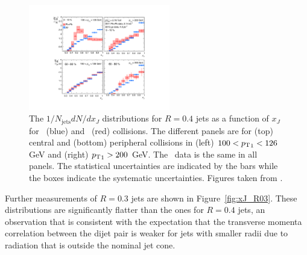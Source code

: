 \begin{figure}[htbp]
\begin{center}
\includegraphics[width=0.55\textwidth]{figures/jetMeasurements/xJ}
\caption{The $1/N_\mathrm{jets} dN/dx_J$ distributions for $R=0.4$ jets as a function of $x_J$ for \pp\ (blue) and \pbpb\ (red) collisions. The different panels are for (top) central and (bottom) peripheral collisions in (left) $100 < \mbox{$p_{\mathrm{T}}$}_1 < 126$ GeV and (right) $\mbox{$p_{\mathrm{T}}$}_1 > 200 $ GeV. The \pp\ data is the same in all panels. The statistical uncertainties are indicated by the bars while the boxes indicate the systematic uncertainties. Figures taken from \cite{Aaboud:2017eww}.}
\label{fig:xJ}
\end{center}
\end{figure}

Further measurements of $R = 0.3$ jets are shown in Figure~\ref{fig:xJ_R03}. These distributions are significantly flatter than the ones for $R=0.4$ jets, an observation that is consistent with the expectation that the transverse momenta correlation between the dijet pair is weaker for jets with smaller radii due to radiation that is outside the nominal jet cone.

